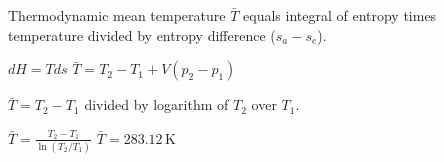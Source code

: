 Thermodynamic mean temperature \( \bar{T} \) equals integral of entropy times temperature divided by entropy difference (\( s_a - s_e \)).  

\( dH = Tds \)  
\( \bar{T} = T_2 - T_1 + V(p_2 - p_1) \)  

\( \bar{T} = T_2 - T_1 \) divided by logarithm of \( T_2 \) over \( T_1 \).  

\( \bar{T} = \frac{T_2 - T_1}{\ln(T_2/T_1)} \)  
\( \bar{T} = 283.12 \, \text{K} \)